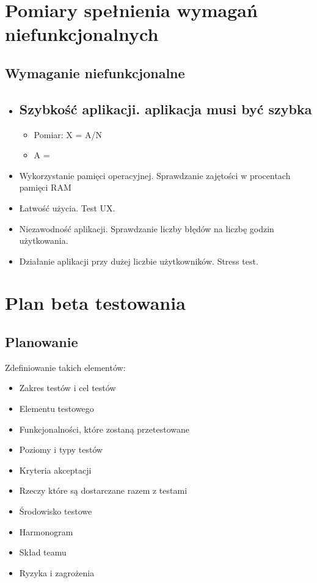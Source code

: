 \documentclass[12pt]{article}
\begin{document}
\section{Pomiary spełnienia wymagań niefunkcjonalnych}
    \subsection{Wymaganie niefunkcjonalne}
    \begin{itemize}
        \item \subsection{Szybkość aplikacji. aplikacja musi być szybka}
              \begin{itemize}
                    \item Pomiar: X = A/N 
                    \item A = 
              
              \end{itemize}
        \item Wykorzystanie pamięci operacyjnej. Sprawdzanie zajętości w procentach pamięci RAM	
        \item Łatwość użycia. Test UX.
        \item Niezawodność aplikacji. Sprawdzanie liczby błędów na liczbę godzin użytkowania.
        \item Działanie aplikacji przy dużej liczbie użytkowników. Stress test.
    \end{itemize}
\section{Plan beta testowania}
\subsection{Planowanie}
Zdefiniowanie takich elementów:
\begin{itemize}
\item Zakres testów i cel testów
\item Elementu testowego
\item Funkcjonalności, które zostaną przetestowane
\item Poziomy i typy testów
\item Kryteria akceptacji
\item Rzeczy które są dostarczane razem z testami
\item Środowisko testowe
\item Harmonogram
\item Skład teamu 
\item Ryzyka i zagrożenia
\end{itemize}
\end{document}

